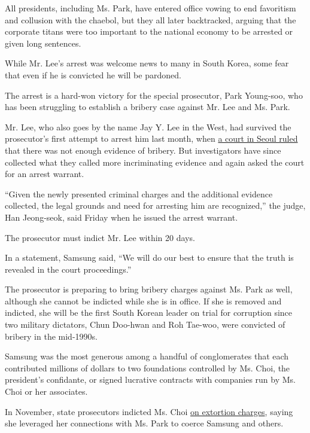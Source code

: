 All presidents, including Ms. Park, have entered office vowing to end
favoritism and collusion with the chaebol, but they all later
backtracked, arguing that the corporate titans were too important to the
national economy to be arrested or given long sentences.

While Mr. Lee's arrest was welcome news to many in South Korea, some
fear that even if he is convicted he will be pardoned.

The arrest is a hard-won victory for the special prosecutor, Park
Young-soo, who has been struggling to establish a bribery case against
Mr. Lee and Ms. Park.

Mr. Lee, who also goes by the name Jay Y. Lee in the West, had survived
the prosecutor's first attempt to arrest him last month, when
\href{https://www.nytimes.com/2017/01/18/world/asia/samsung-korea-president-impeachment.html}{a
court in Seoul ruled} that there was not enough evidence of bribery. But
investigators have since collected what they called more incriminating
evidence and again asked the court for an arrest warrant.

``Given the newly presented criminal charges and the additional evidence
collected, the legal grounds and need for arresting him are
recognized,'' the judge, Han Jeong-seok, said Friday when he issued the
arrest warrant.

The prosecutor must indict Mr. Lee within 20 days.

In a statement, Samsung said, ``We will do our best to ensure that the
truth is revealed in the court proceedings.''

The prosecutor is preparing to bring bribery charges against Ms. Park as
well, although she cannot be indicted while she is in office. If she is
removed and indicted, she will be the first South Korean leader on trial
for corruption since two military dictators, Chun Doo-hwan and Roh
Tae-woo, were convicted of bribery in the mid-1990s.

Samsung was the most generous among a handful of conglomerates that each
contributed millions of dollars to two foundations controlled by Ms.
Choi, the president's confidante, or signed lucrative contracts with
companies run by Ms. Choi or her associates.

In November, state prosecutors indicted Ms. Choi
\href{https://www.nytimes.com/2016/11/20/world/asia/park-geun-hye-south-korea-extortion-accomplice-prosecutors.html}{on
extortion charges}, saying she leveraged her connections with Ms. Park
to coerce Samsung and others.

